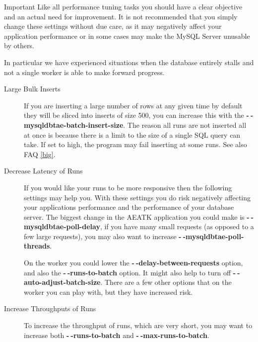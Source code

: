 \documentclass[11pt,letterpaper,oneside]{article}
\begin{document}
\begin{bclogo}[logo=\bcattention, couleurBarre=red, noborder=true]{Important}
Like all performance tuning tasks you should have a clear objective and an actual need for improvement. It is not recommended that you simply change these settings without due care, as it may negatively affect your application performance or in some cases may make the MySQL Server unusable by others.

In particular we have experienced situations when the database entirely stalls and not a single worker is able to make forward progress.
 
\end{bclogo}

\begin{description}

\item[Large Bulk Inserts] If you are inserting a large number of rows at any given time by default they will be sliced into inserts of size 500, you can increase this with the \textbf{-$~\!$-mysqldbtae-batch-insert-size}. The reason all runs are not inserted all at once is because there is a limit to the size of a single SQL query can take. If set to high, the program may fail inserting at some runs. See also FAQ \ref{big}.

\item[Decrease Latency of Runs] If you would like your runs to be more responsive then the following settings may help you. With these settings you do risk negatively affecting your applications performance and the performance of your database server. The biggest change in the AEATK application you could make is \textbf{-$~\!$-mysqldbtae-poll-delay}, if you have many small requests (as opposed to a few large requests), you may also want to increase \textbf{-$~\!$-mysqldbtae-poll-threads}. 

On the worker you could lower the \textbf{-$~\!$-delay-between-requests} option, and also the \textbf{-$~\!$-runs-to-batch} option. It might also help to turn off \textbf{-$~\!$-auto-adjust-batch-size}. There are a few other options that on the worker you can play with, but they have increased risk.

\item[Increase Throughputs of Runs] To increase the throughput of runs, which are very short, you may want to increase both \textbf{-$~\!$-runs-to-batch} and \textbf{-$~\!$-max-runs-to-batch}.

\end{description}
\end{document}
